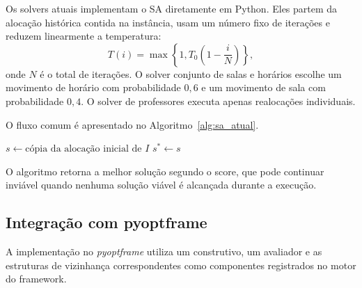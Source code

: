 Os solvers atuais implementam o SA diretamente em Python. Eles partem da alocação histórica contida na instância, usam um número fixo de iterações e reduzem linearmente a temperatura:
\begin{equation}
    T(i)=\max\left\{1,T_0\left(1-\frac{i}{N}\right)\right\},
\end{equation}
onde $N$ é o total de iterações. O solver conjunto de salas e horários escolhe um movimento de horário com probabilidade $0{,}6$ e um movimento de sala com probabilidade $0{,}4$. O solver de professores executa apenas realocações individuais.

O fluxo comum é apresentado no Algoritmo~\ref{alg:sa_atual}.

\begin{algorithm}[H]
\SetAlgoLined
{}
$s\gets\text{cópia da alocação inicial de }I$\;
$s^*\gets s$\;
\;
\caption{Estrutura da implementação inicial de SA}
\label{alg:sa_atual}
\end{algorithm}

O algoritmo retorna a melhor solução segundo o score, que pode continuar inviável quando nenhuma solução viável é alcançada durante a execução.

\subsection{Integração com pyoptframe}

A implementação no \textit{pyoptframe} utiliza um construtivo, um avaliador e as estruturas de vizinhança correspondentes como componentes registrados no motor do framework. 
